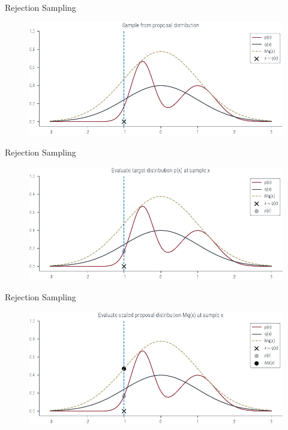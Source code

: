 \documentclass{beamer}
\begin{document}
    \begin{frame}{Rejection Sampling}
        \begin{figure}
            \centering
            \includegraphics[scale = 0.75]{../figures/sampling/rejection-sampling--1.0-True-True-True-True-False-False-False-False.pdf}
        \end{figure}
    \end{frame}

    \begin{frame}{Rejection Sampling}
        \begin{figure}
            \centering
            \includegraphics[scale = 0.75]{../figures/sampling/rejection-sampling--1.0-True-True-True-True-True-False-False-False.pdf}
        \end{figure}
    \end{frame}

    \begin{frame}{Rejection Sampling}
        \begin{figure}
            \centering
            \includegraphics[scale = 0.75]{../figures/sampling/rejection-sampling--1.0-True-True-True-True-True-True-False-False.pdf}
        \end{figure}
    \end{frame}
\end{document}
